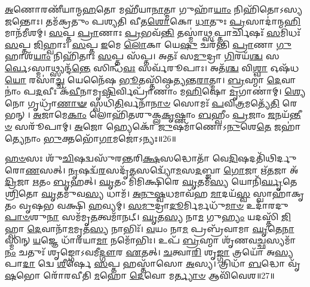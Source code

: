 \-\ul{𑌅}\-𑌣𑍋𑌰𑌣𑍀᳴𑌯𑌾𑌨𑍍𑌮\-\ul{𑌹}\-𑌤𑍋 𑌮𑌹𑍀᳴𑌯𑌾\-\ul{𑌨𑌾}\-𑌤𑍍𑌮𑌾 𑌗𑍁𑌹𑌾᳴\-\ul{𑌯𑌾𑌂} 𑌨𑌿𑌹𑌿᳴𑌤𑍋𑌽𑌸𑍍𑌯 \ul{𑌜}\-𑌨𑍍𑌤𑍋𑌃। 
𑌤𑌮᳴𑌕𑍍𑌰𑌤𑍁𑌂 𑌪𑌶𑍍𑌯𑌤𑌿 𑌵𑍀𑌤\-\ul{𑌶𑍋}\-𑌕𑍋 \ul{𑌧𑌾}\-𑌤𑍁𑌃 \ul{𑌪𑍍𑌰}\-𑌸𑌾𑌦𑌾॑𑌨𑍍𑌮\-\ul{𑌹𑌿}\-𑌮𑌾𑌨᳴\-𑌮𑍀𑌶𑌮𑍍। 
\-\ul{𑌸}\-𑌪𑍍𑌤 \ul{𑌪𑍍𑌰𑌾}\-𑌣𑌾𑌃 \ul{𑌪𑍍𑌰}\-𑌭𑌵᳴\-\ul{𑌨𑍍𑌤𑌿} 𑌤𑌸𑍍𑌮𑌾॑\-\ul{𑌥𑍍𑌸}\-𑌪𑍍𑌤𑌾𑌰𑍍𑌚𑌿𑌷𑌃᳴ \ul{𑌸}\-𑌮𑌿𑌧𑌃᳴ \ul{𑌸}\-𑌪𑍍𑌤 \ul{𑌜𑌿}\-𑌹𑍍𑌵𑌾𑌃। 
\-\ul{𑌸}\-𑌪𑍍𑌤 \ul{𑌇}\-𑌮𑍇 \ul{𑌲𑍋}\-𑌕𑌾 𑌯𑍇\-\ul{𑌷𑍁} 𑌚𑌰᳴𑌨𑍍𑌤𑌿 \ul{𑌪𑍍𑌰𑌾}\-𑌣𑌾 \ul{𑌗𑍁}\-𑌹𑌾𑌶᳴\-\ul{𑌯𑌾𑌂} 𑌨𑌿𑌹𑌿᳴𑌤𑌾𑌃 \ul{𑌸}\-𑌪𑍍𑌤 𑌸᳴𑌪𑍍𑌤। 
𑌅𑌤𑌃᳴ 𑌸\-\ul{𑌮𑍁}\-𑌦𑍍𑌰𑌾 \ul{𑌗𑌿}\-𑌰𑌯᳴\-\ul{𑌶𑍍𑌚} 𑌸\-\ul{𑌰𑍍𑌵𑍇}\-𑌽𑌸𑍍𑌮𑌾𑌥𑍍𑌸𑍍𑌯𑌨𑍍𑌦᳴\-\ul{𑌨𑍍𑌤𑍇} 𑌸𑌿𑌨𑍍𑌧᳴\-\ul{𑌵𑌃} 𑌸𑌰𑍍𑌵᳴𑌰𑍂𑌪𑌾𑌃। 
𑌅𑌤᳴\-\ul{𑌶𑍍𑌚} 𑌵𑌿\-\ul{𑌶𑍍𑌵𑌾} 𑌓𑌷᳴𑌧\-\ul{𑌯𑍋} 𑌰𑌸𑌾॑\-\ul{𑌚𑍍𑌚} 𑌯𑍇𑌨𑍈᳴𑌷 \ul{𑌭𑍂}\-𑌤𑌸𑍍𑌤𑌿᳴𑌷𑍍𑌠𑌤𑍍𑌯𑌨𑍍𑌤\-\ul{𑌰𑌾}\-𑌤𑍍𑌮𑌾। 
\-\ul{𑌬𑍍𑌰}\-𑌹𑍍𑌮𑌾 \ul{𑌦𑍇}\-𑌵𑌾𑌨𑌾𑌂॑ 𑌪\-\ul{𑌦}\-𑌵𑍀𑌃 𑌕᳴\-\ul{𑌵𑍀}\-𑌨𑌾𑌮𑍃\-\ul{𑌷𑌿}\-𑌰𑍍𑌵𑌿𑌪𑍍𑌰𑌾᳴𑌣𑌾𑌂 𑌮\-\ul{𑌹𑌿}\-𑌷𑍋 \ul{𑌮𑍃}\-𑌗𑌾𑌣𑌾॑𑌮𑍍। 
\-\ul{𑌶𑍍𑌯𑍇}\-𑌨𑍋 𑌗𑍃𑌧𑍍𑌰𑌾᳴\-\ul{𑌣𑌾}\-\-\ul{𑍟} 𑌸𑍍𑌵𑌧𑌿᳴\-\ul{𑌤𑌿}\-𑌰𑍍𑌵𑌨𑌾᳴\-\ul{𑌨𑌾}\-\-\ul{𑍞} 𑌸𑍋𑌮𑌃᳴ \ul{𑌪}\-𑌵𑌿\-\ul{𑌤𑍍𑌰}\-𑌮𑌤𑍍𑌯𑍇᳴\-\ul{𑌤𑌿} 𑌰𑍇𑌭𑌨𑍍। 
\-\ul{𑌅}\-𑌜𑌾𑌮𑍇\-\ul{𑌕𑌾𑌂} 𑌲𑍋𑌹𑌿᳴𑌤𑌶𑍁𑌕𑍍𑌲\-\ul{𑌕𑍃}\-𑌷𑍍𑌣𑌾𑌂 \ul{𑌬}\-𑌹𑍍𑌵𑍀𑌂 \ul{𑌪𑍍𑌰}\-𑌜𑌾𑌂 \ul{𑌜}\-𑌨𑌯᳴\-\ul{𑌨𑍍𑌤𑍀}\-\-\ul{𑍞} 𑌸𑌰𑍂᳴𑌪𑌾𑌮𑍍। 
\-\ul{𑌅}\-𑌜𑍋 𑌹𑍍𑌯𑍇𑌕𑍋᳴ \ul{𑌜𑍁}\-𑌷𑌮𑌾᳴𑌣𑍋𑌽\-\ul{𑌨𑍁}\-𑌶𑍇\-\ul{𑌤𑍇} 𑌜𑌹𑌾॑𑌤𑍍𑌯𑍇𑌨𑌾𑌂 \ul{𑌭𑍁}\-𑌕𑍍𑌤𑌭𑍋᳴\-\ul{𑌗𑌾}\-𑌮𑌜𑍋॑𑌽𑌨𑍍𑌯𑌃॥26॥

\-\ul{𑌹}\-\-\ul{𑍞}\-𑌸𑌃 𑌶𑍁᳴\-\ul{𑌚𑌿}\-𑌷𑌦𑍍𑌵𑌸𑍁᳴𑌰𑌨𑍍𑌤𑌰𑌿\-\ul{𑌕𑍍𑌷}\-𑌸𑌦𑍍𑌧𑍋𑌤𑌾᳴ 𑌵𑍇\-\ul{𑌦𑌿}\-𑌷𑌦𑌤𑌿᳴𑌥𑌿𑌰𑍍𑌦𑍁𑌰𑍋\-\ul{𑌣}\-𑌸𑌤𑍍। 
\-\ul{𑌨𑍃}\-𑌷𑌦𑍍𑌵᳴\-\ul{𑌰}\-𑌸𑌦𑍃᳴\-\ul{𑌤}\-𑌸𑌦𑍍𑌵𑍍𑌯𑍋᳴\-\ul{𑌮}\-𑌸\-\ul{𑌦}\-𑌬𑍍𑌜𑌾 \ul{𑌗𑍋}\-𑌜𑌾 𑌋᳴\-\ul{𑌤}\-𑌜𑌾 𑌅᳴\-\ul{𑌦𑍍𑌰𑌿}\-𑌜𑌾 \ul{𑌋}\-𑌤𑌂 \ul{𑌬𑍃}\-𑌹𑌤𑍍। 
\-\ul{𑌘𑍃}\-𑌤𑌂 𑌮𑌿᳴𑌮𑌿𑌕𑍍𑌷𑌿𑌰𑍇 \ul{𑌘𑍃}\-𑌤𑌮᳴\-\ul{𑌸𑍍𑌯} 𑌯𑍋𑌨𑌿᳴\-\ul{𑌰𑍍𑌘𑍃}\-𑌤𑍇 \ul{𑌶𑍍𑌰𑌿}\-𑌤𑍋 \ul{𑌘𑍃}\-𑌤𑌮𑍁᳴𑌵\-\ul{𑌸𑍍𑌯} 𑌧𑌾𑌮᳴। 
\-\ul{𑌅}\-\-\ul{𑌨𑍁}\-\-\ul{𑌷𑍍𑌵}\-𑌧𑌮𑌾𑌵᳴𑌹 \ul{𑌮𑌾}\-𑌦𑌯᳴\-\ul{𑌸𑍍𑌵} 𑌸𑍍𑌵𑌾𑌹𑌾᳴𑌕𑍃𑌤𑌂 𑌵𑍃𑌷𑌭 𑌵𑌕𑍍𑌷𑌿 \ul{𑌹}\-𑌵𑍍𑌯𑌮𑍍। 
\-\ul{𑌸}\-\-\ul{𑌮𑍁}\-𑌦𑍍𑌰𑌾\-\ul{𑌦𑍂}\-𑌰𑍍𑌮𑌿𑌰𑍍𑌮𑌧𑍁᳴\-\ul{𑌮𑌾}\-\-\ul{𑍞} 𑌉𑌦𑌾᳴𑌰𑌦𑍁\-\ul{𑌪𑌾}\-\-\ul{𑍞}\-𑌶𑍁\-\ul{𑌨𑌾} 𑌸𑌮᳴𑌮𑍃\-\ul{𑌤}\-𑌤𑍍𑌵𑌮𑌾᳴𑌨𑌟𑍍। 
\-\ul{𑌘𑍃}\-𑌤\-\ul{𑌸𑍍𑌯} 𑌨𑌾\-\ul{𑌮} 𑌗𑍁\-\ul{𑌹𑍍𑌯𑌂} 𑌯𑌦𑌸𑍍𑌤𑌿᳴ \ul{𑌜𑌿}\-𑌹𑍍𑌵𑌾 \ul{𑌦𑍇}\-𑌵𑌾𑌨𑌾᳴\-\ul{𑌮}\-𑌮𑍃𑌤᳴\-\ul{𑌸𑍍𑌯} 𑌨𑌾𑌭𑌿𑌃᳴। 
\-\ul{𑌵}\-𑌯𑌂 𑌨𑌾\-\ul{𑌮} 𑌪𑍍𑌰𑌬𑍍𑌰᳴𑌵𑌾𑌮𑌾 \ul{𑌘𑍃}\-𑌤𑍇\-\ul{𑌨𑌾}\-𑌸𑍍𑌮𑌿𑌨𑍍 \ul{𑌯}\-𑌜𑍍𑌞𑍇 𑌧𑌾᳴𑌰𑌯𑌾\-\ul{𑌮𑌾} 𑌨𑌮𑍋᳴𑌭𑌿𑌃। 
𑌉𑌪᳴ \ul{𑌬𑍍𑌰}\-𑌹𑍍𑌮𑌾 𑌶𑍃᳴𑌣𑌵\-\ul{𑌚𑍍𑌛}\-𑌸𑍍𑌯𑌮𑌾᳴\-\ul{𑌨𑌂} 𑌚𑌤𑍁𑌃᳴ 𑌶𑍃𑌙𑍍𑌗𑍋𑌽𑌵𑌮𑍀\-\ul{𑌦𑍍𑌗𑍗}\-𑌰 \ul{𑌏}\-𑌤𑌤𑍍। 
\-\ul{𑌚}\-𑌤𑍍𑌵𑌾\-\ul{𑌰𑌿} 𑌶𑍃\-\ul{𑌙𑍍𑌗𑌾} 𑌤𑍍𑌰𑌯𑍋᳴ 𑌅\-\ul{𑌸𑍍𑌯} 𑌪𑌾\-\ul{𑌦𑌾} 𑌦𑍍𑌵𑍇 \ul{𑌶𑍀}\-𑌰𑍍\mbox{}𑌷𑍇 \ul{𑌸}\-𑌪𑍍𑌤 𑌹𑌸𑍍𑌤𑌾᳴𑌸𑍋 \ul{𑌅}\-𑌸𑍍𑌯। 
𑌤𑍍𑌰𑌿𑌧𑌾᳴ \ul{𑌬}\-𑌦𑍍𑌧𑍋 𑌵𑍃᳴\-\ul{𑌷}\-𑌭𑍋 𑌰𑍋᳴𑌰𑌵𑍀𑌤𑌿 \ul{𑌮}\-𑌹𑍋 \ul{𑌦𑍇}\-𑌵𑍋 𑌮\-\ul{𑌰𑍍𑌤𑍍𑌯𑌾}\-\-\ul{𑍞} 𑌆𑌵𑌿᳴𑌵𑍇𑌶॥27॥


